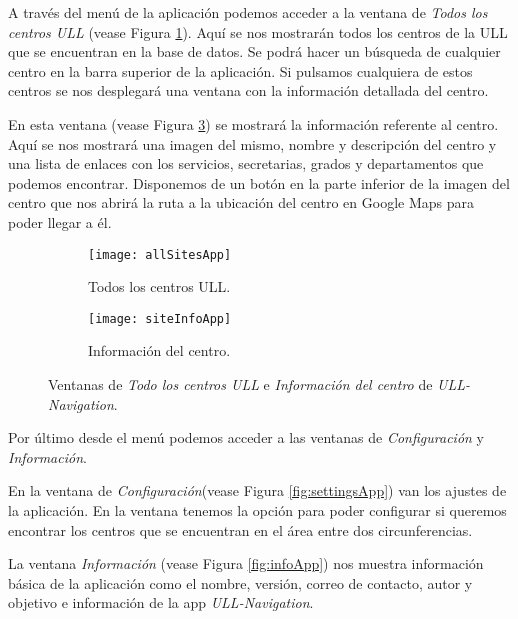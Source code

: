 A través del menú de la aplicación podemos acceder a la ventana de \textit{Todos los centros ULL} (vease Figura \ref{fig:allSitesApp}). Aquí se nos mostrarán todos los centros de la ULL que se encuentran en la base de datos. Se podrá hacer un búsqueda de cualquier centro en la barra superior de la aplicación. Si pulsamos cualquiera de estos centros se nos desplegará una ventana con la información detallada del centro.

En esta ventana (vease Figura \ref{fig:siteInfoApp}) se mostrará la información referente al centro. Aquí se nos mostrará una imagen del mismo, nombre y descripción del centro y una lista de enlaces con los servicios, secretarias, grados y departamentos que podemos encontrar. Disponemos de un botón en la parte inferior de la imagen del centro que nos abrirá la ruta a la ubicación del centro en Google Maps para poder llegar a él.  
 
\begin{figure}[h]
    \hspace*{\fill}%
    \begin{subfigure}[h]{0.35\linewidth}
    \texttt{[image: allSitesApp]}
    \caption{Todos los centros ULL.}
    \label{fig:allSitesApp}
    \end{subfigure}
    \hfill%
    \begin{subfigure}[h]{0.35\linewidth}
    \texttt{[image: siteInfoApp]}
    \caption{Información del centro.}
    \label{fig:siteInfoApp}
    \end{subfigure}%
    \caption{Ventanas de \textit{Todo los centros ULL} e \textit{Información del centro} de \textit{ULL-Navigation}.}
    \hspace*{\fill}%
\end{figure}
 

\vskip 0.9in

Por último desde el menú podemos acceder a las ventanas de \textit{Configuración} y \textit{Información}.

En la ventana de \textit{Configuración}(vease Figura \ref{fig:settingsApp}) van los ajustes de la aplicación. En la ventana tenemos la opción para poder configurar si queremos encontrar los centros que se encuentran en el área entre dos circunferencias.

La ventana \textit{Información} (vease Figura \ref{fig:infoApp}) nos muestra información básica de la aplicación como el nombre, versión, correo de contacto, autor y objetivo e información de la app \textit{ULL-Navigation}. 

